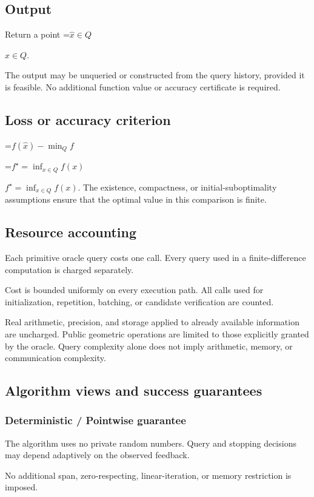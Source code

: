 \documentclass[10pt,a4paper]{article}
\newcommand{\AtlasMath}[1]{\par\begingroup\centering\setbox0=\hbox{$\displaystyle #1$}\ifdim\wd0>1.4\linewidth\typeout{ATLAS WIDE FORMULA: \the\wd0}\fi\ifdim\wd0>\linewidth\resizebox{\linewidth}{!}{\box0}\else\box0\fi\par\endgroup}
\newcommand{\AtlasInlineMath}[1]{\begingroup\setbox0=\hbox{$#1$}\ifdim\wd0>.4\linewidth\endgroup\AtlasMath{#1}\else\endgroup$#1$\fi}
\begin{document}
\subsection{Output}
Return a point \AtlasInlineMath{\widehat x\in Q}.

The output may be unqueried or constructed from the query history, provided it is feasible. No additional function value or accuracy certificate is required.

\subsection{Loss or accuracy criterion}

\AtlasMath{f(\widehat{x})-\min_Q f}


\AtlasInlineMath{f^\star=\inf_{x\in Q}f(x)}. The existence, compactness, or initial-suboptimality assumptions ensure that the optimal value in this comparison is finite.

\subsection{Resource accounting}
Each primitive oracle query costs one call. Every query used in a finite-difference computation is charged separately.

Cost is bounded uniformly on every execution path. All calls used for initialization, repetition, batching, or candidate verification are counted.

Real arithmetic, precision, and storage applied to already available information are uncharged. Public geometric operations are limited to those explicitly granted by the oracle. Query complexity alone does not imply arithmetic, memory, or communication complexity.

\subsection{Algorithm views and success guarantees}
\subsubsection{Deterministic / Pointwise guarantee}
The algorithm uses no private random numbers. Query and stopping decisions may depend adaptively on the observed feedback.

No additional span, zero-respecting, linear-iteration, or memory restriction is imposed.
\end{document}
